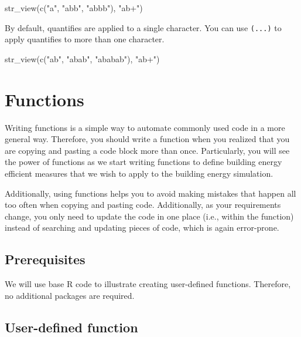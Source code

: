\documentclass[
]{book}
\newenvironment{Shaded}{\begin{snugshade}}{\end{snugshade}}
\newcommand{\FunctionTok}[1]{\textcolor[rgb]{0.00,0.00,0.00}{#1}}
\newcommand{\NormalTok}[1]{#1}
\newcommand{\StringTok}[1]{\textcolor[rgb]{0.31,0.60,0.02}{#1}}
\begin{document}
\begin{Shaded}
\begin{Highlighting}[]
\FunctionTok{str\_view}\NormalTok{(}\FunctionTok{c}\NormalTok{(}\StringTok{"a"}\NormalTok{, }\StringTok{"abb"}\NormalTok{, }\StringTok{"abbb"}\NormalTok{), }\StringTok{"ab+"}\NormalTok{)}
\end{Highlighting}
\end{Shaded}

By default, quantifies are applied to a single character. You can use \texttt{(...)} to apply quantifies to more than one character.

\begin{Shaded}
\begin{Highlighting}[]
\FunctionTok{str\_view}\NormalTok{(}\FunctionTok{c}\NormalTok{(}\StringTok{"ab"}\NormalTok{, }\StringTok{"abab"}\NormalTok{, }\StringTok{"ababab"}\NormalTok{), }\StringTok{"ab+"}\NormalTok{)}
\end{Highlighting}
\end{Shaded}

\hypertarget{functions}{%
\chapter{Functions}\label{functions}}

Writing functions is a simple way to automate commonly used code in a more general way. Therefore, you should write a function when you realized that you are copying and pasting a code block more than once. Particularly, you will see the power of functions as we start writing functions to define building energy efficient measures that we wish to apply to the building energy simulation.

Additionally, using functions helps you to avoid making mistakes that happen all too often when copying and pasting code. Additionally, as your requirements change, you only need to update the code in one place (i.e., within the function) instead of searching and updating pieces of code, which is again error-prone.

\hypertarget{prerequisites-5}{%
\section{Prerequisites}\label{prerequisites-5}}

We will use base R code to illustrate creating user-defined functions. Therefore, no additional packages are required.

\hypertarget{user-defined-function}{%
\section{User-defined function}\label{user-defined-function}}
\end{document}
